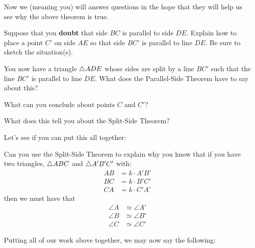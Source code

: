 
Now we (meaning you) will answer questions in the hope that they will
help us see why the above theorem is true.

\begin{question}
Suppose that you \textbf{doubt} that side $BC$ is parallel to side $DE$. Explain
how to place a point $C'$ on side $AE$ so that side $BC'$ is
parallel to line $DE$. Be sure to sketch the situation(s).
\end{question}
\QM

\begin{question} 
You now have a triangle $\triangle ADE$ whose sides are split by a line
$BC'$ such that the line $BC'$ is parallel to line $DE$. What does the
Parallel-Side Theorem have to say about this?
\end{question}
\QM

\begin{question} What can you conclude about points $C$ and $C'$?
\end{question}
\QM


\begin{question} 
What does this tell you about the Split-Side Theorem?
\end{question}
\QM




Let's see if you can put this all together:
\begin{question}
Can you use the Split-Side Theorem to explain why you know that
if you have two triangles, $\triangle ABC$ and $\triangle A'B'C'$ with:
\begin{align*}
AB &= k\cdot A'B'\\
BC &= k\cdot B'C'\\
CA &= k\cdot C'A'
\end{align*}
then we must have that
\begin{align*}
\angle A &\simeq \angle A'\\
\angle B &\simeq \angle B' \\
\angle C &\simeq \angle C'
\end{align*}
\end{question}
\QM

Putting all of our work above together, we may now say the following:





